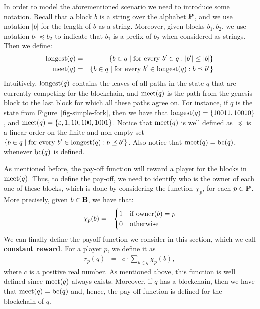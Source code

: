 In order to model the aforementioned scenario we need to introduce some notation.
Recall that a block $b$ is a string over the alphabet $\mathbf{P}$, and we use notation $|b|$ for the length of $b$ as a string. Moreover, given blocks $b_1, b_2$, we use notation $b_1 \preceq b_2$ to indicate that $b_1$ is a prefix of $b_2$  when considered as strings. Then we define: 
\begin{eqnarray*}
{\text{\rm longest}}(q) & = & \{ b \in q \mid \text{for every } b' \in q: |b'| \leq |b|\}\\
\text{\rm meet}(q) & = & \{b \in q \mid \text{for every } b' \in {\text{\rm longest}}(q): b \preceq b'\}
\end{eqnarray*}
Intuitively, ${\text{\rm longest}}(q)$ contains the leaves of all paths in the state $q$ that are currently competing for the blockchain, and $\text{\rm meet}(q)$ is the path from the genesis block to the last block for which all these paths agree on. For instance, if $q$ is the state from Figure~\ref{fig-simple-fork}, then we have that ${\text{\rm longest}}(q)=\{10011,10010\}$, and $\text{\rm meet}(q)=\{\varepsilon, 1, 10, 100, 1001\}$. Notice that $\text{\rm meet}(q)$ is well defined as $\preceq$ is a linear order on the finite and non-empty set $\{b \in q \mid \text{for every } b' \in {\text{\rm longest}}(q): b \preceq b'\}$. Also notice that $\text{\rm meet}(q)=\text{bc}(q)$, whenever $\text{bc}(q)$ is defined.

As mentioned before, the pay-off function will reward a player for the blocks in $\text{\rm meet}(q)$. Thus, to define the pay-off, we need to identify who is the owner of each one of these blocks, which is done by considering the function $\chi_p$, for each $p \in \mathbf{P}$. More precisely, given $b \in \mathbf{B}$, we have that:
\begin{eqnarray*}
\chi_p(b) & = & 
\begin{cases}
1 & \text{if } \text{\rm owner}(b) = p\\
0 & \text{otherwise}
\end{cases}
\end{eqnarray*}
We can finally define the payoff function we consider in this section, which we call \textbf{constant reward}. For a player $p$, we define it as 
\begin{eqnarray*}
r_p(q) & = & 
{\displaystyle c \cdot \sum_{b \in q} \chi_p(b),}
\end{eqnarray*}
where $c$ is a positive real number. As mentioned above, this function is well defined since $\text{\rm meet}(q)$ always exists. Moreover, if $q$ has a blockchain, then we have that $\text{\rm meet}(q) = \text{bc}(q)$ and, hence, the pay-off function is defined for the blockchain of $q$.
 
